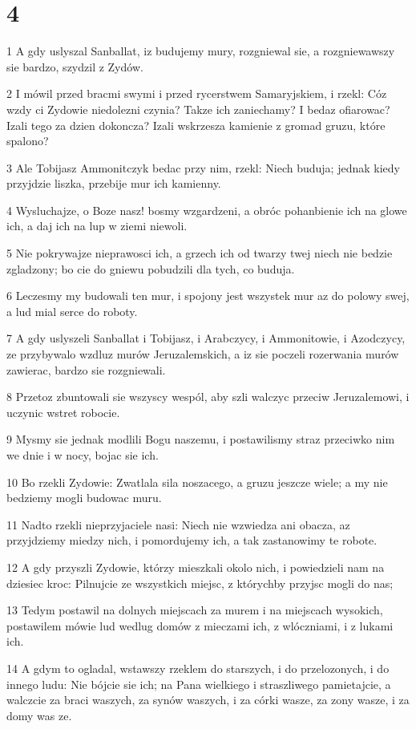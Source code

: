 \chapter{4}

\par 1 A gdy uslyszal Sanballat, iz budujemy mury, rozgniewal sie, a rozgniewawszy sie bardzo, szydzil z Zydów.
\par 2 I mówil przed bracmi swymi i przed rycerstwem Samaryjskiem, i rzekl: Cóz wzdy ci Zydowie niedolezni czynia? Takze ich zaniechamy? I bedaz ofiarowac? Izali tego za dzien dokoncza? Izali wskrzesza kamienie z gromad gruzu, które spalono?
\par 3 Ale Tobijasz Ammonitczyk bedac przy nim, rzekl: Niech buduja; jednak kiedy przyjdzie liszka, przebije mur ich kamienny.
\par 4 Wysluchajze, o Boze nasz! bosmy wzgardzeni, a obróc pohanbienie ich na glowe ich, a daj ich na lup w ziemi niewoli.
\par 5 Nie pokrywajze nieprawosci ich, a grzech ich od twarzy twej niech nie bedzie zgladzony; bo cie do gniewu pobudzili dla tych, co buduja.
\par 6 Leczesmy my budowali ten mur, i spojony jest wszystek mur az do polowy swej, a lud mial serce do roboty.
\par 7 A gdy uslyszeli Sanballat i Tobijasz, i Arabczycy, i Ammonitowie, i Azodczycy, ze przybywalo wzdluz murów Jeruzalemskich, a iz sie poczeli rozerwania murów zawierac, bardzo sie rozgniewali.
\par 8 Przetoz zbuntowali sie wszyscy wespól, aby szli walczyc przeciw Jeruzalemowi, i uczynic wstret robocie.
\par 9 Mysmy sie jednak modlili Bogu naszemu, i postawilismy straz przeciwko nim we dnie i w nocy, bojac sie ich.
\par 10 Bo rzekli Zydowie: Zwatlala sila noszacego, a gruzu jeszcze wiele; a my nie bedziemy mogli budowac muru.
\par 11 Nadto rzekli nieprzyjaciele nasi: Niech nie wzwiedza ani obacza, az przyjdziemy miedzy nich, i pomordujemy ich, a tak zastanowimy te robote.
\par 12 A gdy przyszli Zydowie, którzy mieszkali okolo nich, i powiedzieli nam na dziesiec kroc: Pilnujcie ze wszystkich miejsc, z którychby przyjsc mogli do nas;
\par 13 Tedym postawil na dolnych miejscach za murem i na miejscach wysokich, postawilem mówie lud wedlug domów z mieczami ich, z wlóczniami, i z lukami ich.
\par 14 A gdym to ogladal, wstawszy rzeklem do starszych, i do przelozonych, i do innego ludu: Nie bójcie sie ich; na Pana wielkiego i straszliwego pamietajcie, a walczcie za braci waszych, za synów waszych, i za córki wasze, za zony wasze, i za domy was ze.
